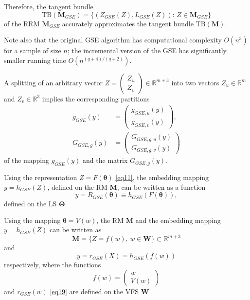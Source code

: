 \documentclass[conference]{IEEEtran} %
\def\mbW{\mathbf{W}}
\def\mbTheta{{\bm\Theta}}
\def\mbtheta{{\bm\theta}}
\def\mbM{\mathbf{M}}
\def\RR{\mathbb{R}}
\begin{document}
Therefore, the tangent bundle
\[
	\mathrm{TB}(\mbM_{GSE}) = \{(Z_{GSE}(Z), L_{GSE}(Z)):\, Z \in\mbM_{GSE}\}
\]
of the RRM $\mbM_{GSE}$ accurately approximates the tangent bundle $\mathrm{TB}(\mbM)$.

Note also that the original GSE algorithm \cite{bib21,bib22} has computational complexity $O(n^3)$ for a sample of size $n$; the incremental version of the GSE \cite{bib27} has significantly smaller running time $O(n^{(q+4)/(q+2)})$.

A splitting of an arbitrary vector
$Z = \left(
\begin{array}{c}
Z_u\\
Z_v
\end{array}
\right)\in\RR^{m+3}$ into two vectors $Z_u\in\RR^m$ and $Z_v\in\RR^3$ implies the corresponding partitions
\begin{align}
	g_{GSE}(y) &=
\left(\begin{array}{c}
g_{GSE,u}(y)\\
g_{GSE,v}(y)
\end{array}
\right), \label{eq17}
\\
	G_{GSE,g}(y) &=
\left(\begin{array}{c}
G_{GSE,g,u}(y)\\
G_{GSE,g,v}(y)
\end{array}
\right) \label{eq1711}
\end{align}
of the mapping $g_{GSE}(y)$ and the matrix $G_{GSE,g}(y)$.

Using the representation $Z = F(\mbtheta)$ \eqref{eq11}, the embedding mapping $y = h_{GSE}(Z)$, defined on the RM $\mbM$, can be written as a function
\begin{equation}
\label{eq18}
	y = R_{GSE}(\mbtheta) \equiv h_{GSE}(F(\mbtheta)),
\end{equation}
defined on the LS $\mbTheta$.

Using the mapping $\mbtheta = V(w)$, the RM $\mbM$ and the embedding mapping $y = h_{GSE}(Z)$ can be written as
\[
	\mbM = \{Z=f(w),\,w\in\mathbf{W}\}\subset\RR^{m+3}
\]
and
\begin{equation}
\label{eq19}
	y = r_{GSE}(X) = h_{GSE}(f(w))
\end{equation}
respectively, where the functions
\[
	f(w) = \left(\begin{array}{c}
w\\
V(w)
\end{array}
\right)
\]
and $r_{GSE}(w)$ \eqref{eq19} are defined on the VFS $\mbW$.
\end{document}
